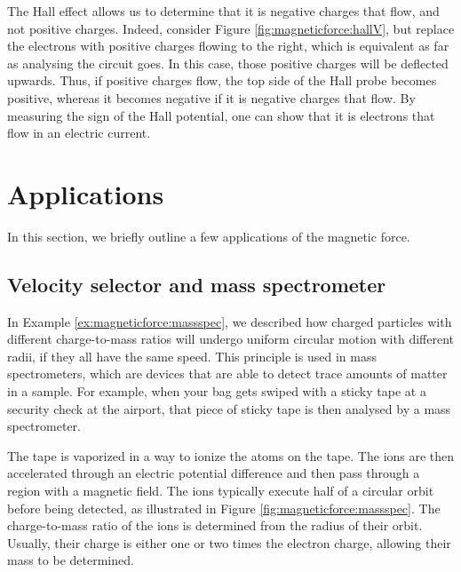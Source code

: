 The Hall effect allows us to determine that it is negative charges that flow, and not positive charges. Indeed, consider Figure \ref{fig:magneticforce:hallV}, but replace the electrons with positive charges flowing to the right, which is equivalent as far as analysing the circuit goes. In this case, those positive charges will be deflected upwards. Thus, if positive charges flow, the top side of the Hall probe becomes positive, whereas it becomes negative if it is negative charges that flow. By measuring the sign of the Hall potential, one can show that it is electrons that flow in an electric current.

\section{Applications}
In this section, we briefly outline a few applications of the magnetic force.
\subsection{Velocity selector and mass spectrometer}
In Example \ref{ex:magneticforce:massspec}, we described how charged particles with different charge-to-mass ratios will undergo uniform circular motion with different radii, if they all have the same speed. This principle is used in mass spectrometers, which are devices that are able to detect trace amounts of matter in a sample. For example, when your bag gets swiped with a sticky tape at a security check at the airport, that piece of sticky tape is then analysed by a mass spectrometer.

The tape is vaporized in a way to ionize the atoms on the tape. The ions are then accelerated through an electric potential difference and then pass through a region with a magnetic field. The ions typically execute half of a circular orbit before being detected, as illustrated in Figure \ref{fig:magneticforce:massspec}. The charge-to-mass ratio of the ions is determined from the radius of their orbit. Usually, their charge is either one or two times the electron charge, allowing their mass to be determined. 

